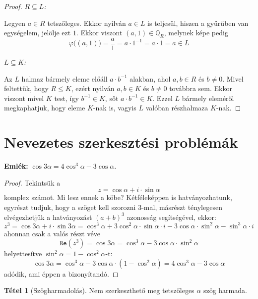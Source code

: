 \documentclass[12pt]{book}
\theoremstyle{plain} %
\theoremstyle{definition} %
\newtheorem{theo/}{Tétel}[section]
\newenvironment{theo}
  {\renewcommand{\qedsymbol}{$\clubsuit$}%
   \pushQED{\qed}\begin{theo/}}
  {\popQED\end{theo/}}
\theoremstyle{remark}
\renewcommand\qedsymbol{$\blacksquare$}
\numberwithin{equation}{section}  %
\begin{document}
\begin{proof}
		\textit{$R\subseteq L$:}
		
		Legyen $a\in R$ tetszőleges. Ekkor nyilván $a\in L$ is teljesül, hiszen a gyűrűben van egységelem, jelölje ezt $1$. Ekkor viszont $(a,1)\in \mathbb{Q}_R$, melynek képe pedig
		\[ \varphi\Big((a,1)\Big) = \dfrac{a}{1} = a\cdot 1^{-1} = a\cdot 1 = a\in L  \]
		
		\textit{$L\subseteq K$:}
		
		Az $L$ halmaz bármely eleme előáll $a\cdot b^{-1}$ alakban, ahol $a,b\in R$ és $b\neq 0$. Mivel feltettük, hogy $R\leq K$, ezért nyilván $a,b\in K$ és $b\neq 0$ továbbra sem. Ekkor viszont mivel $K$ test, így $b^{-1}\in K$, sőt $a\cdot b^{-1}\in K$. Ezzel $L$ bármely eleméről megkaphatjuk, hogy eleme $K$-nak is, vagyis $L$ valóban részhalmaza $K$-nak.
	\end{proof}
	
	\section{Nevezetes szerkesztési problémák}
	
	\textbf{Emlék:} $\cos{3\alpha} = 4\cos^3\alpha - 3\cos{\alpha}$.
	
	\begin{proof}
		Tekintsük a
		\[ z = \cos\alpha + i\cdot \sin\alpha  \]
		komplex számot. Mi lesz ennek a köbe? Kétféleképpen is hatványozhatunk, egyrészt tudjuk, hogy a szöget kell szorozni $3$-mal, másrészt ténylegesen elvégezhetjük a hatványozást $(a+b)^3$ azonosság segítségével, ekkor:
		\[ z^3 = \cos3\alpha + i\cdot \sin 3\alpha = \cos^3\alpha +3\cos^2\alpha \cdot \sin\alpha \cdot i - 3 \cos\alpha \cdot \sin^2 \alpha - \sin^3\alpha \cdot i  \]
		ahonnan csak a valós részt véve
		\[ \mathtt{Re}(z^3) = \cos 3\alpha = \cos^3 \alpha - 3\cos\alpha \cdot \sin^2\alpha \]
		helyettesítve $\sin^2\alpha = 1 - \cos^2\alpha$-t:
		\[ \cos 3\alpha = \cos^3\alpha - 3\cos \alpha \cdot (1-\cos^2\alpha) = 4\cos ^3 \alpha -3\cos \alpha  \]
		adódik, ami éppen a bizonyítandó.
	\end{proof}
	
	\begin{theo}[Szögharmadolás]
		Nem szerkeszthető meg tetszőleges $\alpha$ szög harmada.
	\end{theo}
	
\end{document}
